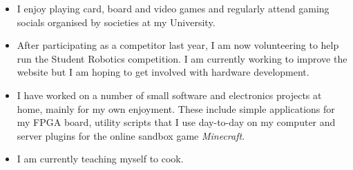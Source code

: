 
\begin{itemize}
\item I enjoy playing card, board and video games and regularly attend gaming socials organised by societies at my University.
\item After participating as a competitor last year, I am now volunteering to help run the Student Robotics competition. I am currently working to improve the website but I am hoping to get involved with hardware development.
\item I have worked on a number of small software and electronics projects at home, mainly for my own enjoyment. These include simple applications for my FPGA board, utility scripts that I use day-to-day on my computer and server plugins for the online sandbox game \emph{Minecraft}.
\item I am currently teaching myself to cook.
\end{itemize}
